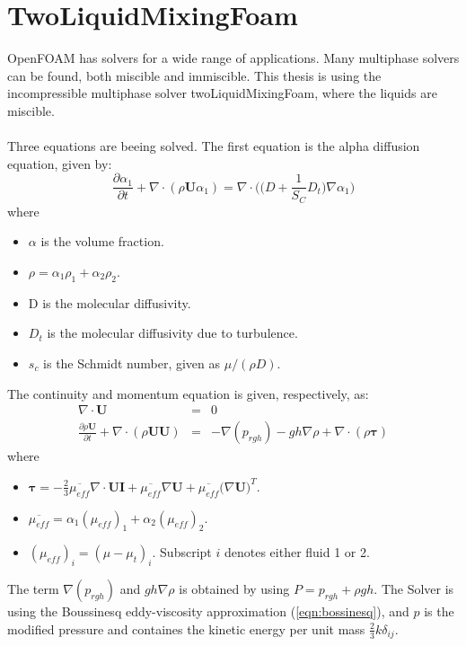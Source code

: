 \documentclass[a4paper, 12pt]{report}
\begin{document}
\section{TwoLiquidMixingFoam}
OpenFOAM has solvers for a wide range of applications. Many multiphase solvers can be found, both miscible and immiscible. This thesis is using the incompressible multiphase solver twoLiquidMixingFoam, where the liquids are miscible.\\
\\
Three equations are beeing solved. The first equation is the alpha diffusion equation, given by:
\begin{equation}
\frac{\partial \alpha_1}{\partial t} + \nabla \cdot (\rho \mathbf{U} \alpha_1) = \nabla \cdot \Big(\big(D + \frac{1}{S_C} D_t \big)\nabla \alpha_1 \Big) 
\label{eqn:alphaEqTLMF}
\end{equation}
where
\begin{itemize}
	\item $\alpha$ is the volume fraction.	
	\item $\rho = \alpha_1 \rho_1 + \alpha_2 \rho_2$.
	\item D is the molecular diffusivity.
	\item $D_t$ is the molecular diffusivity due to turbulence.
	\item $s_c$ is the Schmidt number, given as $\mu / (\rho D)$.
\end{itemize}
The continuity and momentum equation is given, respectively, as: 
\begin{eqnarray}
\label{eqn:continuityTLMF}
\nabla \cdot \mathbf{U} &=& 0 \\
\label{eqn:momentumTLMF}
\frac{\partial \rho \mathbf{U}}{\partial t} + \nabla \cdot(\rho \mathbf{U} \mathbf{U}) &=& - \nabla (p_{rgh}) - gh\nabla \rho + \nabla \cdot (\rho \boldsymbol{\tau})
\end{eqnarray}
where 
\begin{itemize}
	\item $\boldsymbol{\tau} = -\frac{2}{3}\overline{\mu_{eff}}\nabla \cdot \mathbf{U} \mathbf{I} + \overline{\mu_{eff}}\nabla \mathbf{U} + \overline{\mu_{eff}}\big(\nabla \mathbf{U}\big)^T$.
	\item $\overline{\mu_{eff}} = \alpha_1 (\mu_{eff})_1 + \alpha_2 (\mu_{eff})_2$.
	\item $(\mu_{eff})_i = (\mu - \mu_t)_i$. Subscript $i$ denotes either fluid 1 or 2.
\end{itemize}
The term $\nabla(p_{rgh})$ and $gh \nabla \rho$ is obtained by using $P = p_{rgh} + \rho gh$. The Solver is using the Boussinesq eddy-viscosity approximation (\ref{eqn:bossinesq}), and $p$ is the modified pressure and containes the kinetic energy per unit mass $\frac{2}{3}k\delta_{ij}$. 
\end{document}
